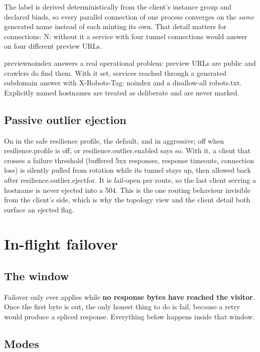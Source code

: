 \documentclass[11pt,a4paper,oneside]{book}
\newcommand{\aperiobreakableunderscore}{\textunderscore\allowbreak}
\newcommand{\aperiocodebreaks}{\XeTeXinterchartokenstate=1 }
\newcommand{\aperiocodebreaks}{}
\DeclareRobustCommand{\code}[1]{{\ttfamily\small\aperiocodebreaks
  \let\_\aperiobreakableunderscore#1}}
\begin{document}
The label is derived deterministically from the client's instance group
and declared binds, so every parallel connection of one process converges
on the \emph{same} generated name instead of each minting its own. That
detail matters for \code{connections: N}: without it a service with four
tunnel connections would answer on four different preview URLs.

\code{preview\_noindex} answers a real operational problem: preview URLs
are public and crawlers do find them. With it set, services reached
through a generated subdomain answer with \code{X-Robots-Tag: noindex}
and a disallow-all \code{robots.txt}. Explicitly named hostnames are
treated as deliberate and are never marked.

\section{Passive outlier ejection}

On in the \code{safe} resilience profile, the default, and in
\code{aggressive}; off when \code{resilience.profile} is \code{off}, or
\code{resilience.outlier.enabled} says so. With it, a client that crosses a failure threshold (buffered 5xx
responses, response timeouts, connection loss) is silently pulled from
rotation while its tunnel stays up, then allowed back after
\code{resilience.outlier.eject\_for}. It is fail-open per route, so the
last client serving a hostname is never ejected into a \code{504}. This
is the one routing behaviour invisible from the client's side, which is
why the topology view and the client detail both surface an
\code{ejected} flag.

\chapter{In-flight failover}
\label{ch:failover}

\section{The window}

Failover only ever applies while \textbf{no response bytes have reached
the visitor}. Once the first byte is out, the only honest thing to do is
fail, because a retry would produce a spliced response. Everything below
happens inside that window.

\section{Modes}
\end{document}
